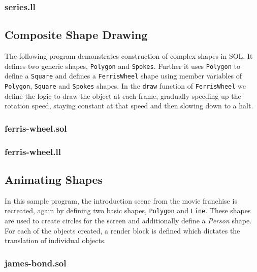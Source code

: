 \documentclass[letterpaper,12pt]{report}
\begin{document}
{    \subsubsection{series.ll}
    

    \subsection{Composite Shape Drawing}
    The following program demonstrates construction of complex shapes in SOL. It defines two generic shapes, \texttt{Polygon} and \texttt{Spokes}. Further it uses \texttt{Polygon} to define a \texttt{Square} and defines a \texttt{FerrisWheel} shape using member variables of \texttt{Polygon}, \texttt{Square} and \texttt{Spokes} shapes. In the \texttt{draw} function of \texttt{FerrisWheel} we define the logic to draw the object at each frame, gradually speeding up the rotation speed, staying constant at that speed and then slowing down to a halt.

    \subsubsection{ferris-wheel.sol}
    

    \subsubsection{ferris-wheel.ll}
    

    \subsection{Animating Shapes}
    In this sample program, the introduction scene from the  movie franchise is recreated, again by defining two basic shapes, \texttt{Polygon} and \texttt{Line}. These shapes are used to create circles for the screen and additionally define a \textit{Person} shape. For each of the objects created, a render block is defined which dictates the translation of individual objects.

    \subsubsection{james-bond.sol}
    

}
\end{document}
